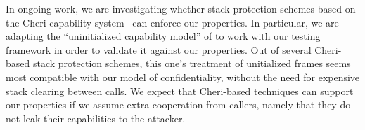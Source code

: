 \documentclass[acmtog,review,anonymous]{acmart}\settopmatter{printfolios=true,printccs=false,printacmref=false}
\begin{document}
In ongoing work, we are investigating whether stack protection schemes
based on the Cheri capability system~\citep{Woodruff+14,Chisnall+15}
can enforce our properties.  In particular, we are adapting
the ``uninitialized capability model'' of \citet{Georges+21} to work with
our testing framework in order to validate it against our properties. Out of several Cheri-based
stack protection schemes, this one's treatment of unitialized frames seems most compatible
with our model of confidentiality, without the need for expensive stack clearing
between calls. We expect that Cheri-based techniques can support our properties if we
assume extra cooperation from callers, namely that they do not leak their capabilities
to the attacker. %



\end{document}
